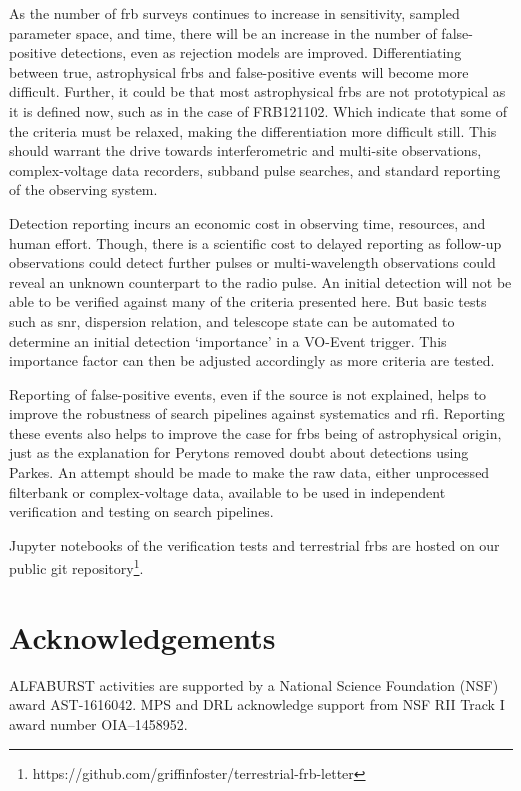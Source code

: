 \documentclass[a4paper,fleqn,usenatbib]{mnras}
\begin{document}
As the number of \gls{frb} surveys continues to increase in sensitivity, sampled
parameter space, and time, there will be an increase in the number of
false-positive detections, even as rejection models are improved.
Differentiating between true, astrophysical \glspl{frb} and false-positive
events will become more difficult.  Further, it could be that most astrophysical
\glspl{frb} are not prototypical as it is defined now, such as in the case of
FRB121102. Which indicate that some of the criteria must be relaxed,
making the differentiation more difficult still.  This should warrant the drive
towards interferometric and multi-site observations, complex-voltage data
recorders, subband pulse searches, and standard reporting of the observing
system.

Detection reporting incurs an economic cost in observing time, resources, and
human effort. Though, there is a scientific cost to delayed reporting as
follow-up observations could detect further pulses or multi-wavelength
observations could reveal an unknown counterpart to the radio pulse. An initial
detection will not be able to be verified against many of the criteria presented
here. But basic tests such as \gls{snr}, dispersion relation, and telescope
state can be automated to determine an initial detection `importance' in a
VO-Event trigger. This importance factor can then be adjusted accordingly as
more criteria are tested.

Reporting of false-positive events, even if the source is not explained, helps
to improve the robustness of search pipelines against systematics and \gls{rfi}.
Reporting these events also helps to improve the case for \glspl{frb} being of
astrophysical origin, just as the explanation for Perytons
\citep{2015MNRAS.451.3933P} removed doubt about detections using Parkes. An
attempt should be made to make the raw data, either unprocessed filterbank or
complex-voltage data, available to be used in independent verification and
testing on search pipelines.

Jupyter notebooks of the verification tests and terrestrial \glspl{frb} are
hosted on our public git
repository\footnote{https://github.com/griffinfoster/terrestrial-frb-letter}.

\section*{Acknowledgements}

ALFABURST activities are supported by a National Science Foundation
(NSF) award AST-1616042. MPS and DRL acknowledge support from NSF RII Track I
award number OIA--1458952.


 

\bsp	%
\label{lastpage}
\end{document}
